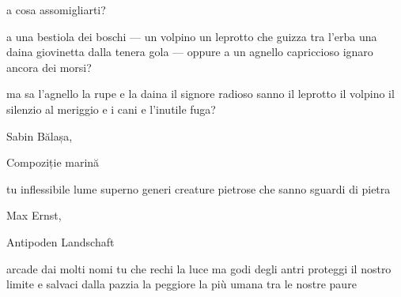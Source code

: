 \clearpage


\begin{poem}
	\begin{stanza}
		a cosa assomigliarti?
	\end{stanza}

	\begin{stanza}
		a una bestiola dei boschi —\verseline
		un volpino un leprotto che guizza tra l'erba\verseline
		una daina giovinetta dalla tenera gola —\verseline
		oppure a un agnello capriccioso\verseline
		ignaro ancora dei morsi?
	\end{stanza}

	\begin{stanza}
		ma sa l'agnello la rupe\verseline
		e la daina il signore radioso\verseline
		sanno il leprotto il volpino\verseline
		il silenzio al meriggio e i cani\verseline
		e l'inutile fuga?
	\end{stanza}
\end{poem}

\clearpage


\begin{artItem}
	Sabin Bălașa, \begin{otherlanguage}{romanian}%
		Compoziţie marină%
	\end{otherlanguage}
\end{artItem}

\begin{poem}
	\begin{stanza}
		tu inflessibile\verseline
		lume superno\verseline
		generi creature\verseline
		pietrose\verseline
		che sanno sguardi\verseline
		di pietra
	\end{stanza}
\end{poem}

\clearpage


\begin{artItem}
	Max Ernst, \begin{otherlanguage}{german}%
		Antipoden Landschaft%
	\end{otherlanguage}
\end{artItem}

\begin{poem}
	\begin{stanza}
		arcade dai molti nomi\verseline
		tu che rechi la luce\verseline
		ma godi degli antri\verseline
		proteggi il nostro limite\verseline
		e salvaci dalla pazzia\verseline
		la peggiore la più umana\verseline
		tra le nostre paure
	\end{stanza}
\end{poem}
